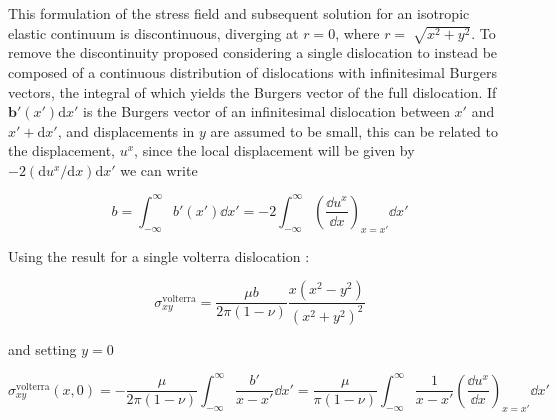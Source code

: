 This formulation of the stress field and subsequent solution for an isotropic elastic continuum is discontinuous, diverging at $r=0$, where $r=\sqrt[]{x^2+y^2}$. To remove the discontinuity \citet{Eshelby1949} proposed considering a single dislocation to instead be composed of a continuous distribution of dislocations with infinitesimal Burgers vectors, the integral of which yields the Burgers vector of the full dislocation. If $\bm{b}'(x')\mathrm{d}x'$ is the Burgers vector of an infinitesimal dislocation between $x'$ and $x'+\mathrm{d} x'$, and displacements in $y$ are assumed to be small, this can be related to the displacement, $u^x$, since the local displacement will be given by $-2(\mathrm{d} u^x/\mathrm{d} x)\mathrm{d} x'$ \cite{hirth_lothe1982peierls_displacements} we can write


\begin{equation}
b = \int_{-\infty}^{\infty} b'(x') \dd x' = -2\int^{\infty}_{-\infty} \left( \! \frac{\dd u^x}{\dd x} \right)_{x=x'} \dd x' 
\end{equation}

Using the result for a single volterra dislocation \cite{hirth_lothe_1982_volterra_stress_field}:

\begin{equation}
\sigma^{\text{volterra}}_{xy} = \frac{\mu b}{2\pi (1-\nu)} \frac{x(x^2 - y^2)}{(x^2+y^2)^2}
\end{equation}

and setting $y=0$

\begin{equation}
\sigma^{\text{volterra}}_{xy}(x,0) = -\frac{\mu}{2\pi(1-\nu)} \int^{\infty}_{-\infty} \frac{b'}{x-x'} \!\dd x' =  \frac{\mu}{\pi(1-\nu)} \int^{\infty}_{-\infty} \frac{1}{x-x'} \left(\!\frac{\dd u^x}{\dd x}\right)_{x=x'} \!\dd x'
\label{eqn:elastic_stress_at_slip_plane}
\end{equation}

